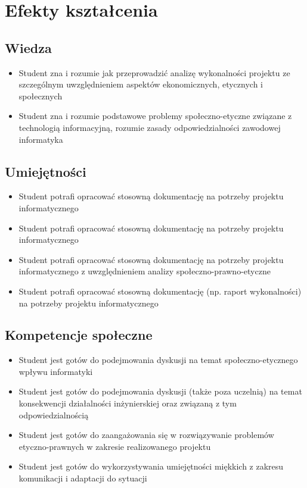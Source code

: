 \documentclass[12pt, a4paper]{article}
\begin{document}
\section{Efekty kształcenia}

\subsection*{Wiedza}
\begin{itemize}
  \item Student zna i rozumie jak przeprowadzić analizę wykonalności projektu ze szczególnym uwzględnieniem aspektów ekonomicznych, etycznych i społecznych
  \item Student zna i rozumie podstawowe problemy społeczno-etyczne związane z technologią informacyjną, rozumie zasady odpowiedzialności zawodowej informatyka
\end{itemize}

\subsection*{Umiejętności}
\begin{itemize}
  \item Student potrafi opracować stosowną dokumentację na potrzeby projektu informatycznego
  \item Student potrafi  opracować stosowną dokumentację na potrzeby projektu informatycznego
  \item Student potrafi  opracować stosowną dokumentację na potrzeby projektu informatycznego z uwzględnieniem analizy społeczno-prawno-etyczne
  \item Student potrafi  opracować stosowną dokumentację (np. raport wykonalności) na potrzeby projektu informatycznego
\end{itemize}

\subsection*{Kompetencje społeczne}
\begin{itemize}
  \item Student jest gotów do  podejmowania dyskusji na temat społeczno-etycznego wpływu informatyki
  \item Student jest gotów do  podejmowania dyskusji (także poza uczelnią) na temat konsekwencji działalności inżynierskiej oraz związaną z tym odpowiedzialnością
  \item Student jest gotów do  zaangażowania się w rozwiązywanie problemów etyczno-prawnych w zakresie realizowanego projektu
  \item Student jest gotów do  wykorzystywania umiejętności miękkich z zakresu komunikacji i adaptacji do sytuacji
\end{itemize}
\end{document}
